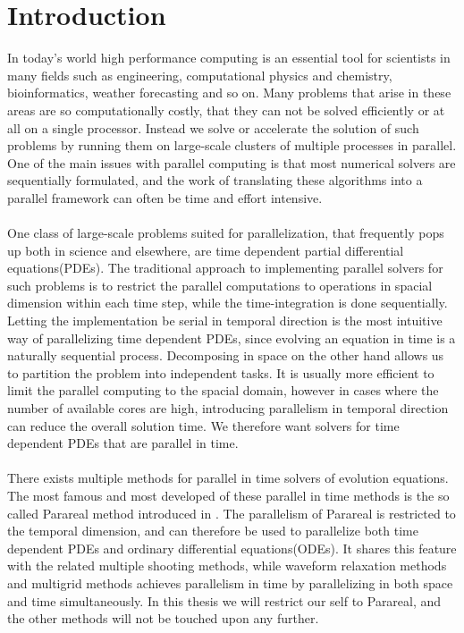 \chapter{Introduction}
In today’s world high performance computing is an essential tool for scientists in many fields such as engineering, computational physics and chemistry, bioinformatics, weather forecasting and so on. Many problems that arise in these areas are so computationally costly, that they can not be solved efficiently or at all on a single processor. Instead we solve or accelerate the solution of such problems by running them on large-scale clusters of multiple processes in parallel. One of the main issues with parallel computing is that most numerical solvers are sequentially formulated, and the work of translating these algorithms into a parallel framework can often be time and effort intensive.
\\
\\
One class of large-scale problems suited for parallelization, that frequently pops up both in science and elsewhere, are time dependent partial differential equations(PDEs). The traditional approach to implementing parallel solvers for such problems is to restrict the parallel computations to operations in spacial dimension within each time step, while the time-integration is done sequentially. Letting the implementation be serial in temporal direction is the most intuitive way of parallelizing time dependent PDEs, since evolving an equation in time is a naturally sequential process. Decomposing in space on the other hand allows us to partition the problem into independent tasks. It is usually more efficient to limit the parallel computing to the spacial domain, however in cases where the number of available cores are high, introducing parallelism in temporal direction can reduce the overall solution time. We therefore want solvers for time dependent PDEs that are parallel in time.
\\
\\
There exists multiple methods for parallel in time solvers of evolution equations. The most famous and most developed of these parallel in time methods is the so called Parareal method introduced in \cite{lions2001resolution}. The parallelism of Parareal is restricted to the temporal dimension, and can therefore be used to parallelize both time dependent PDEs and ordinary differential equations(ODEs). It shares this feature with the related multiple shooting methods\cite{nievergelt1964parallel,bellen1989parallel}, while waveform relaxation methods\cite{lelarasmee1982waveform,gander1996overlapping} and multigrid methods\cite{hackbusch1985parabolic,lubich1987multi,horton1995space} achieves parallelism in time by parallelizing in both space and time simultaneously. In this thesis we will restrict our self to Parareal, and the other methods will not be touched upon any further.
